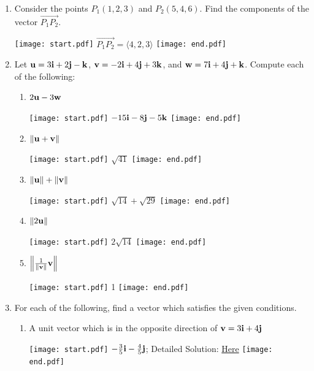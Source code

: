 \documentclass[12pt]{article}
\begin{document}
\begin{enumerate}
\item Consider the points $P_1(1,2,3)$ and $P_2(5,4,6)$.  Find the components of the vector $\overrightarrow{P_1P_2}$.

\texttt{[image: start.pdf]}
{{$\overrightarrow{P_1P_2}=\langle 4,2,3 \rangle$}}
\texttt{[image: end.pdf]}


\item Let ${\bf u}= 3{\bf i}+2{\bf j}-{\bf k}$, ${\bf v}=-2{\bf i}+4{\bf j}+3{\bf k}$, and ${\bf w}=7{\bf i}+4{\bf j}+{\bf k}$.  Compute each of the following:

\begin{enumerate}

\item $2{\bf u}-3{\bf w}$

\texttt{[image: start.pdf]}
{{$-15{\bf i}-8{\bf j}-5{\bf k}$}}
\texttt{[image: end.pdf]}


\item $\| {\bf u}+{\bf v}\|$

\texttt{[image: start.pdf]}
{{$\sqrt{41}$}}
\texttt{[image: end.pdf]}


\item $\| {\bf u}\|+\|{\bf v}\|$

\texttt{[image: start.pdf]}
{{$\sqrt{14}+\sqrt{29}$}}
\texttt{[image: end.pdf]}


\item $\|2{\bf u}\|$

\texttt{[image: start.pdf]}
{{$2\sqrt{14}$}}
\texttt{[image: end.pdf]}


\item $\left\|\frac{1}{\|{\bf v}\|}{\bf v}\right\|$

\texttt{[image: start.pdf]}
{{1}}
\texttt{[image: end.pdf]}


\end{enumerate}

\item For each of the following, find a vector which satisfies the given conditions.

\begin{enumerate}

\item A unit vector which is in the opposite direction of ${\bf v}=3{\bf i}+4{\bf j}$

\texttt{[image: start.pdf]}
{{$-\frac{3}{5}{\bf i}-\frac{4}{5}{\bf j}$; Detailed Solution: \textcolor{blue}{\href{http://www.math.drexel.edu/classes/Calculus/resources/Math200HW/Solutions/02_200_Vectors_07.pdf}{Here}}}}
\texttt{[image: end.pdf]}



\end{enumerate}
\end{enumerate}
\end{document}

